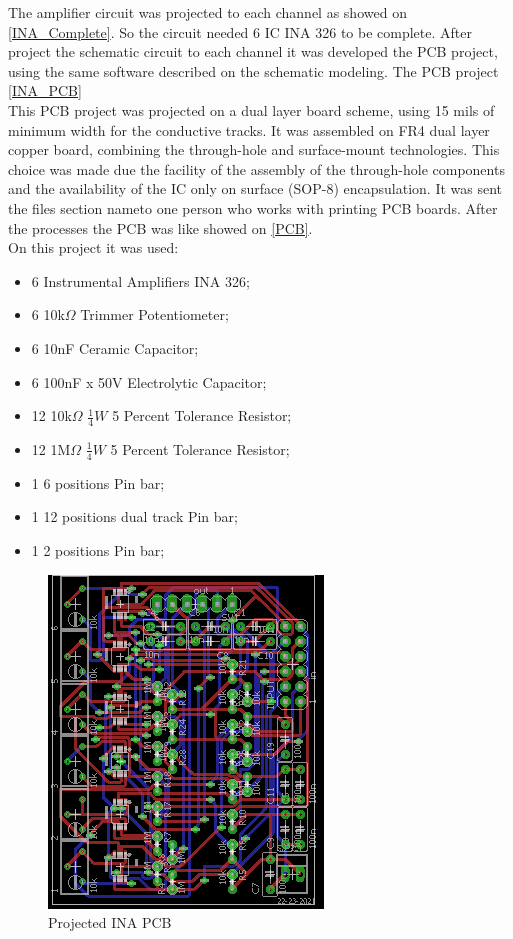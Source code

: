 The amplifier circuit was projected to each channel as showed on \autoref{INA_Complete}.
So the circuit needed 6 IC INA 326 to be complete.  After project
the schematic circuit to each channel it was developed the PCB project, using the
same software described on the schematic modeling. The PCB project \autoref{INA_PCB}\\


This PCB project \label{INA_PCB_doc} was projected on a dual layer board scheme, using 15 mils of
minimum width for the conductive tracks. It was assembled on FR4 dual layer copper
board, combining the through-hole and surface-mount technologies. This choice was
made due the facility of the assembly of the through-hole components and the availability
of the IC only on surface (SOP-8) encapsulation. It was sent
the files section nameto one person who works with printing PCB boards. After the processes
the PCB was like showed on \autoref{PCB}.\\

On this project it was used:

\begin{itemize}
\item 6 Instrumental Amplifiers INA 326;
\item 6 10k$\Omega$ Trimmer Potentiometer;
\item 6 10nF Ceramic Capacitor;
\item 6 100nF x 50V Electrolytic Capacitor;
\item 12 10k$\Omega$ $\frac{1}{4}W$ 5 Percent Tolerance Resistor;
\item 12 1M$\Omega$ $\frac{1}{4}W$ 5 Percent Tolerance Resistor;
\item 1 6 positions Pin bar;
\item 1 12 positions dual track Pin bar;
\item 1 2 positions Pin bar;
\end{itemize}

\begin{figure}[!htpb]
\centering
\caption{Projected INA PCB}
\label{INA_PCB}
\includegraphics[scale=1.5]{images/TCC_INA}
\end{figure}

